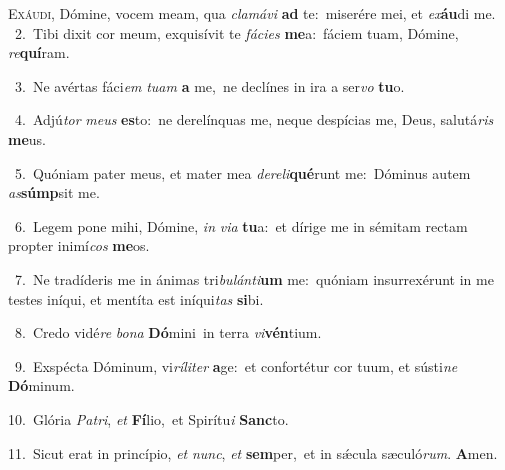 \lettrine{\initial\textcolor{\initialcolor}{E}}{xáudi,} Dómine, vocem meam, qua \textit{cla}\-\textit{má}\textit{vi} \textbf{ad} te:~\star miserére mei, et \textit{ex}\-\textbf{áu}di me.\\
{\numbfont\textcolor{\numbcolor}{~2.}}~Tibi dixit cor meum, exquisívit te \textit{fá}\-\textit{ci}\textit{es} \textbf{me}\-a:~\star fáciem tuam, Dómine, \textit{re}\-\textbf{quí}ram.\par
{\numbfont\textcolor{\numbcolor}{~3.}}~Ne avértas fáci\textit{em} \textit{tu}\-\textit{am} \textbf{a} me,~\star ne declínes in ira a ser\textit{vo} \textbf{tu}\-o.\par
{\numbfont\textcolor{\numbcolor}{~4.}}~Adjú\textit{tor} \textit{me}\-\textit{us} \textbf{es}\-to:~\star ne derelínquas me, neque despícias me, Deus, salutá\textit{ris} \textbf{me}\-us.\par
{\numbfont\textcolor{\numbcolor}{~5.}}~Quóniam pater meus, et mater mea \textit{de}\-\textit{re}\textit{li}\textbf{qué}runt me:~\star Dóminus autem \textit{as}\-\textbf{súmp}sit me.\par
{\numbfont\textcolor{\numbcolor}{~6.}}~Legem pone mihi, Dómine, \textit{in} \textit{vi}\-\textit{a} \textbf{tu}\-a:~\star et dírige me in sémitam rectam propter inimí\textit{cos} \textbf{me}\-os.\par
{\numbfont\textcolor{\numbcolor}{~7.}}~Ne tradíderis me in ánimas tri\-\textit{bu}\-\textit{lán}\textit{ti}\textbf{um} me:~\star quóniam insurrexérunt in me testes iníqui, et mentíta est iníqui\textit{tas} \textbf{si}\-bi.\par
{\numbfont\textcolor{\numbcolor}{~8.}}~Credo vidé\textit{re} \textit{bo}\-\textit{na} \textbf{Dó}\-mini~\star in terra \textit{vi}\-\textbf{vén}tium.\par
{\numbfont\textcolor{\numbcolor}{~9.}}~Exspécta Dóminum, vi\-\textit{rí}\-\textit{li}\textit{ter} \textbf{a}\-ge:~\star et confortétur cor tuum, et sústi\textit{ne} \textbf{Dó}\-minum.\par
{\numbfont\textcolor{\numbcolor}{10.}}~Glória \textit{Pa}\-\textit{tri}, \textit{et} \textbf{Fí}\-lio,~\star et Spirítu\textit{i} \textbf{Sanc}\-to.\par
{\numbfont\textcolor{\numbcolor}{11.}}~Sicut erat in princípio, \textit{et} \textit{nunc}\-, \textit{et} \textbf{sem}\-per,~\star et in sǽcula sæculó\-\textit{rum}\-. \textbf{A}\-men.\par
